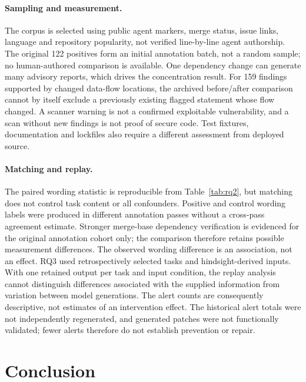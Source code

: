 \documentclass[acmsmall,screen,nonacm]{acmart}
\begin{document}
\paragraph{Sampling and measurement.} The corpus is selected using public agent markers, merge status, issue links, language and repository popularity, not verified line-by-line agent authorship. The original 122 positives form an initial annotation batch, not a random sample; no human-authored comparison is available. One dependency change can generate many advisory reports, which drives the concentration result. For 159 findings supported by changed data-flow locations, the archived before/after comparison cannot by itself exclude a previously existing flagged statement whose flow changed. A scanner warning is not a confirmed exploitable vulnerability, and a scan without new findings is not proof of secure code. Test fixtures, documentation and lockfiles also require a different assessment from deployed source.

\paragraph{Matching and replay.} The paired wording statistic is reproducible from Table~\ref{tab:rq2}, but matching does not control task content or all confounders. Positive and control wording labels were produced in different annotation passes without a cross-pass agreement estimate. Stronger merge-base dependency verification is evidenced for the original annotation cohort only; the comparison therefore retains possible measurement differences. The observed wording difference is an association, not an effect. RQ3 used retrospectively selected tasks and hindsight-derived inputs. With one retained output per task and input condition, the replay analysis cannot distinguish differences associated with the supplied information from variation between model generations. The alert counts are consequently descriptive, not estimates of an intervention effect. The historical alert totals were not independently regenerated, and generated patches were not functionally validated; fewer alerts therefore do not establish prevention or repair.

\section{Conclusion}
\end{document}
